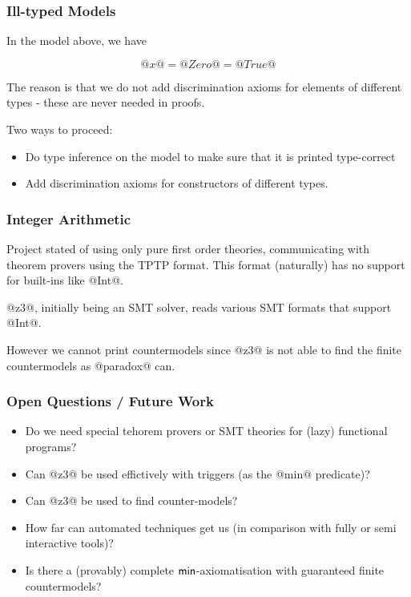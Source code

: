 \documentclass[serif,professionalfont]{beamer}
\begin{document}
\begin{frame}
  \frametitle{Ill-typed Models}
    In the model above, we have

    $$@x@ = @Zero@ = @True@$$

    The reason is that we do not add discrimination axioms for
    elements of different types - these are never needed in proofs.

    Two ways to proceed:

    \begin{itemize}

      \item Do type inference on the model to make sure that it is
        printed type-correct

      \item Add discrimination axioms for constructors of different
        types.

    \end{itemize}
\end{frame}

\begin{frame}
  \frametitle{Integer Arithmetic}

  Project stated of using only pure first order theories,
  communicating with theorem provers using the \textrm{TPTP} format.
  This format (naturally) has no support for built-ins like @Int@.

  @z3@, initially being an SMT solver, reads various SMT formats that
  support @Int@.

  However we cannot print countermodels since @z3@ is not able to
  find the finite countermodels as @paradox@ can.

\end{frame}

\begin{frame}
  \frametitle{Open Questions / Future Work}

    \begin{itemize}

      \item Do we need special tehorem provers or SMT theories for
        (lazy) functional programs?

      \item Can @z3@ be used effictively with triggers (as the @min@
        predicate)?

      \item Can @z3@ be used to find counter-models?

      \item How far can automated techniques get us (in comparison
        with fully or semi interactive tools)?

      \item Is there a (provably) complete $\mathsf{min}$-axiomatisation with
        guaranteed finite countermodels?

    \end{itemize}

\end{frame}
\end{document}
